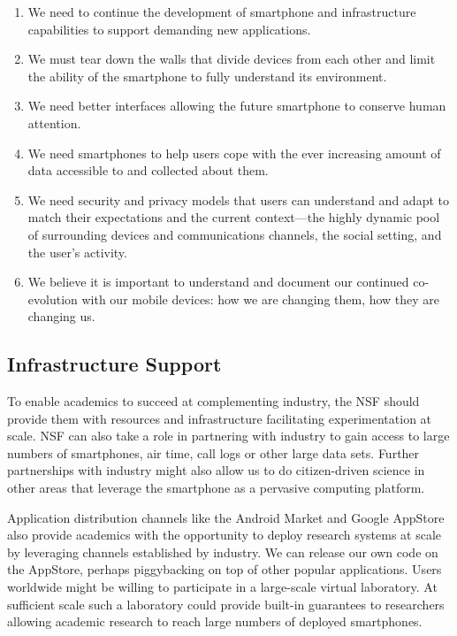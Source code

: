 \begin{enumerate}

\item We need to continue the development of smartphone and infrastructure
capabilities to support demanding new applications.

\item We must tear down the walls that divide devices from each other and
limit the ability of the smartphone to fully understand its environment.

\item We need better interfaces allowing the future smartphone to conserve human
attention.

\item We need smartphones to help users cope with the ever increasing amount of
data accessible to and collected about them.

\item We need security and privacy models that users can understand and adapt
to match their expectations and the current context---the highly dynamic pool
of surrounding devices and communications channels, the social setting, and
the user’s activity. 

\item We believe it is important to understand and document our continued
co-evolution with our mobile devices: how we are changing them, how they are
changing us.

\end{enumerate}

\subsection{Infrastructure Support}

To enable academics to succeed at complementing industry, the NSF should
provide them with resources and infrastructure facilitating experimentation
at scale. NSF can also take a role in partnering with industry to gain access
to large numbers of smartphones, air time, call logs or other large data
sets. Further partnerships with industry might also allow us to do
citizen-driven science in other areas that leverage the smartphone as a
pervasive computing platform.

Application distribution channels like the Android Market and Google AppStore
also provide academics with the opportunity to deploy research systems at
scale by leveraging channels established by industry. We can release our own
code on the AppStore, perhaps piggybacking on top of other popular
applications. Users worldwide might be willing to participate in a
large-scale virtual laboratory. At sufficient scale such a laboratory could
provide built-in guarantees to researchers allowing academic research to
reach large numbers of deployed smartphones.

